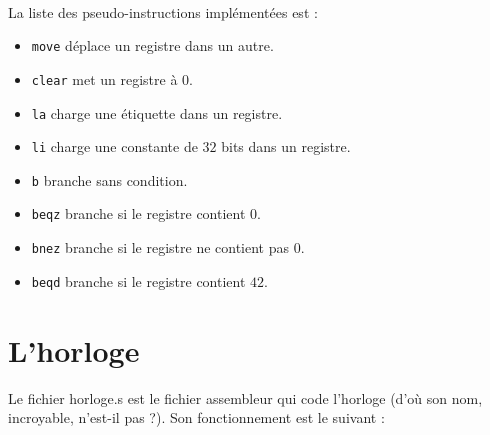 \documentclass[13pt]{article}
\begin{document}
\text{}\\
La liste des pseudo-instructions implémentées est :
\begin{itemize}
\item \texttt{move} déplace un registre dans un autre.
\item \texttt{clear} met un registre à $0$.
\item \texttt{la} charge une étiquette dans un registre.
\item \texttt{li} charge une constante de $32$ bits dans un registre.
\item \texttt{b} branche sans condition.
\item \texttt{beqz} branche si le registre contient $0$.
\item \texttt{bnez} branche si le registre ne contient pas $0$.
\item \texttt{beqd} branche si le registre contient $42$.
\end{itemize}

\section{L'horloge}

Le fichier horloge.s est le fichier assembleur qui code l'horloge (d'où son nom,
incroyable, n'est-il pas ?). Son fonctionnement est le suivant :
\end{document}
